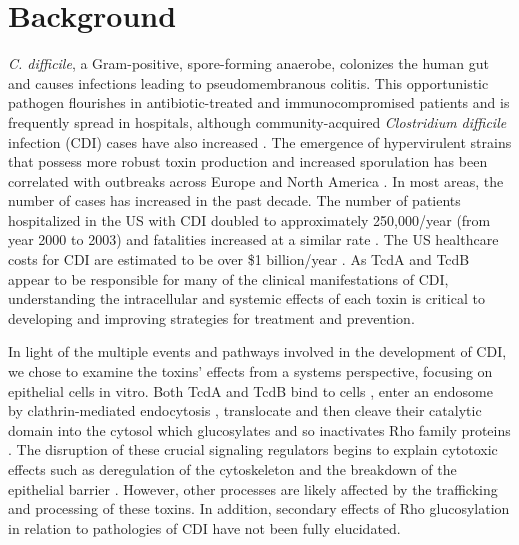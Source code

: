 \section{Background}
\textit{C. difficile}, a Gram-positive, spore-forming 
anaerobe, colonizes the human gut and causes infections 
leading to pseudomembranous colitis.  This opportunistic 
pathogen flourishes in antibiotic-treated and immunocompromised 
patients and is frequently spread in hospitals, although 
community-acquired \textit{Clostridium difficile} 
infection (CDI) cases have also increased \cite{Freeman:2010bv}. 
The emergence of hypervirulent strains that possess more 
robust toxin production and increased sporulation has been 
correlated with outbreaks across Europe and North 
America \cite{Warny:2005kd}. In most areas, the number 
of cases has increased in the past decade. The number 
of patients hospitalized in the US with CDI doubled to 
approximately 250,000/year (from year 2000 to 2003) and 
fatalities increased at a similar rate \cite{Zilberberg:2008gd}. 
The US healthcare costs for CDI are estimated to be over \$1 
billion/year \cite{Dubberke:2009ic}. As TcdA and TcdB appear 
to be responsible for many of the clinical manifestations of 
CDI, understanding the intracellular and systemic effects 
of each toxin is critical to developing and improving strategies 
for treatment and prevention.

In light of the multiple events and pathways involved in 
the development of CDI, we chose to examine the toxins' 
effects from a systems perspective, focusing on epithelial 
cells in vitro. Both TcdA and TcdB bind to 
cells \cite{Frisch:2003ul}, enter an endosome by clathrin-mediated 
endocytosis \cite{Papatheodorou:2010io}, translocate and then 
cleave their catalytic domain into the cytosol which 
glucosylates and so inactivates Rho family 
proteins \cite{Egerer:2007fy}. The disruption of these crucial 
signaling regulators begins to explain cytotoxic effects 
such as deregulation of the cytoskeleton and the breakdown 
of the epithelial barrier \cite{Nusrat:2001cs}. However, 
other processes are likely affected by the trafficking 
and processing of these toxins. In addition, secondary 
effects of Rho glucosylation in relation to pathologies 
of CDI have not been fully elucidated.

